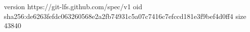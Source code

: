 version https://git-lfs.github.com/spec/v1
oid sha256:de6263fefdc063260568e2a2fb74931c5a07c7416c7efccd181e3f9bef4d0ff4
size 43840

